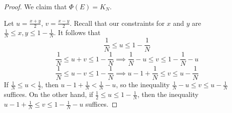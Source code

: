 \documentclass{article}
\theoremstyle{plain} %
\numberwithin{thm}{section} %
\theoremstyle{definition}
\begin{document}
\begin{proof}
    We claim that \(\Phi (E) = K_N\).

    Let \(u = \frac{x+y}{2}\), \(v = \frac{x-y}{2}\). Recall that our constraints for \(x\) and \(y\) are \(\frac{1}{N} \leq x,y \leq 1 - \frac{1}{N}\). It follows that
    \[
        \frac{1}{N} \leq u \leq 1-\frac{1}{N}
    \]
    \[
        \frac{1}{N} \leq u+v \leq 1 - \frac{1}{N} \implies \frac{1}{N} - u \leq v \leq 1 - \frac{1}{N} - u
    \]
    \[
        \frac{1}{N} \leq u-v \leq 1 - \frac{1}{N} \implies u - 1 + \frac{1}{N} \leq v \leq u - \frac{1}{N}
    \]
    If \(\frac{1}{N} \leq u < \frac{1}{2}\), then \(u - 1 + \frac{1}{N} < \frac{1}{N} - u\), so the inequality \(\frac{1}{N} - u \leq v \leq u - \frac{1}{N}\) suffices. On the other hand, if \(\frac{1}{2} \leq u \leq 1 - \frac{1}{N}\), then the inequality \(u - 1 + \frac{1}{N} \leq v \leq 1 - \frac{1}{N} - u\) suffices.


\end{proof}
\end{document}
